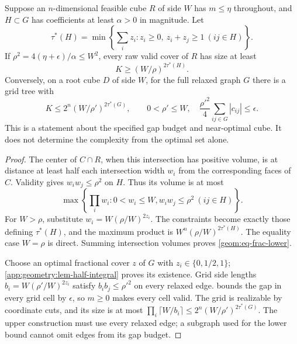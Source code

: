 \begin{proposition}
\label{geom:prop-fractional}
Suppose an $n$-dimensional feasible cube $R$ of side $W$ has
$m\leq\eta$ throughout, and $H\subset G$ has coefficients at least
$\alpha>0$ in magnitude. Let
\[
 \tau^*(H)=\min\left\{\sum_i z_i:z_i\geq0,
                                  \ z_i+z_j\geq1\ (ij\in H)\right\}.
\]
If $\rho^2=4(\eta+\epsilon)/\alpha\leq W^2$, every raw valid cover
of $R$ has size at least
\begin{equation}\label{geom:eq-frac-lower}
 K\geq(W/\rho)^{2\tau^*(H)}.
\end{equation}
Conversely, on a root cube $D$ of side $W$, for the full relaxed graph
$G$ there is a grid tree with
\begin{equation}\label{geom:eq-frac-upper}
 K\leq2^n(W/\rho')^{2\tau^*(G)},\qquad
 0<\rho'\leq W,\quad
 \frac{\rho'^2}{4}\sum_{ij\in G}|c_{ij}|\leq\epsilon.
\end{equation}
This is a statement about the specified gap budget and near-optimal
cube. It does not determine the complexity from the optimal set alone.
\end{proposition}
\begin{proof}
The center of $C\cap R$, when this intersection has positive volume,
is at distance at least half each intersection width $w_i$ from the
corresponding faces of $C$. Validity gives $w_iw_j\leq\rho^2$ on $H$.
Thus its volume is at most
\[
 \max\left\{\prod_iw_i:0<w_i\leq W, w_iw_j\leq\rho^2\ (ij\in H)
                                                    \right\}.
\]
For $W>\rho$, substitute $w_i=W(\rho/W)^{2z_i}$. The constraints
become exactly those defining $\tau^*(H)$, and the maximum product
is $W^n(\rho/W)^{2\tau^*(H)}$. The equality case $W=\rho$ is direct.
Summing intersection volumes proves \cref{geom:eq-frac-lower}.

Choose an optimal fractional cover $z$ of $G$ with
$z_i\in\{0,1/2,1\}$; \cref{app:geometry:lem-half-integral} proves
its existence. Grid side lengths
$b_i=W(\rho'/W)^{2z_i}$ satisfy $b_ib_j\leq\rho'^2$ on every
relaxed edge.  bounds the gap in every grid
cell by $\epsilon$, so $m\geq0$ makes every cell valid. The grid is
realizable by coordinate cuts, and its size is at most
$\prod_i\lceil W/b_i\rceil\leq2^n(W/\rho')^{2\tau^*(G)}$.
The upper construction must use every relaxed edge; a subgraph used
for the lower bound cannot omit edges from its gap budget.
\end{proof}

